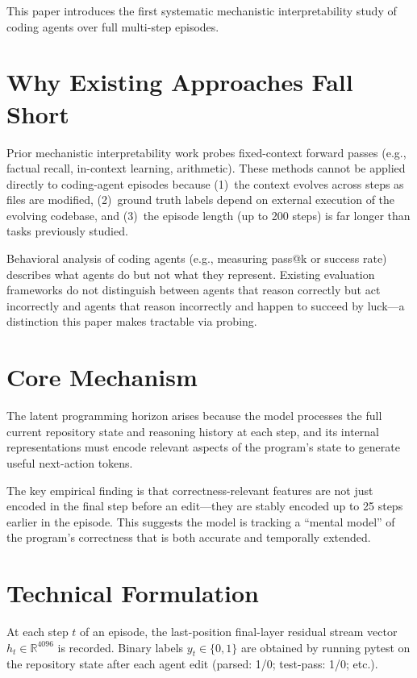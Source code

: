 \documentclass[10pt,twocolumn]{article}
\begin{document}
This paper introduces the first systematic mechanistic interpretability
study of coding agents over full multi-step episodes.

\section{Why Existing Approaches Fall Short}

Prior mechanistic interpretability work probes fixed-context forward
passes (e.g., factual recall, in-context learning, arithmetic). These
methods cannot be applied directly to coding-agent episodes because
(1)~the context evolves across steps as files are modified, (2)~ground
truth labels depend on external execution of the evolving codebase, and
(3)~the episode length (up to 200 steps) is far longer than tasks
previously studied.

Behavioral analysis of coding agents (e.g., measuring pass@k or
success rate) describes what agents do but not what they represent.
Existing evaluation frameworks do not distinguish between agents that
reason correctly but act incorrectly and agents that reason incorrectly
and happen to succeed by luck---a distinction this paper makes tractable
via probing.

\section{Core Mechanism}

The latent programming horizon arises because the model processes
the full current repository state and reasoning history at each step,
and its internal representations must encode relevant aspects of the
program's state to generate useful next-action tokens.

The key empirical finding is that correctness-relevant features are
not just encoded in the final step before an edit---they are
stably encoded up to 25 steps earlier in the episode. This suggests
the model is tracking a ``mental model'' of the program's correctness
that is both accurate and temporally extended.

\section{Technical Formulation}

At each step $t$ of an episode, the last-position final-layer residual
stream vector $h_t \in \mathbb{R}^{4096}$ is recorded. Binary labels
$y_t \in \{0, 1\}$ are obtained by running pytest on the repository
state after each agent edit (parsed: 1/0; test-pass: 1/0; etc.).
\end{document}
